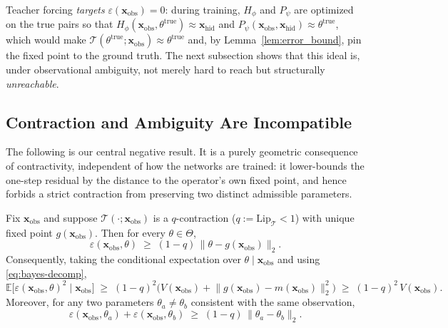 Teacher forcing \emph{targets} $\varepsilon(\mathbf{x}_\mathrm{obs})=0$: during training, $H_\phi$ and $P_\psi$ are optimized on the true pairs so that $H_\phi(\mathbf{x}_\mathrm{obs}, \theta^\mathrm{true})\approx \mathbf{x}_\mathrm{hid}$ and $P_\psi(\mathbf{x}_\mathrm{obs}, \mathbf{x}_\mathrm{hid})\approx \theta^\mathrm{true}$, which would make $\mathcal{T}(\theta^{\mathrm{true}}; \mathbf{x}_\mathrm{obs})\approx\theta^{\mathrm{true}}$ and, by Lemma~\ref{lem:error_bound}, pin the fixed point to the ground truth. The next subsection shows that this ideal is, under observational ambiguity, not merely hard to reach but structurally \emph{unreachable}.

\subsection{Contraction and Ambiguity Are Incompatible}
\label{subsec:incompat}

The following is our central negative result. It is a purely geometric consequence of contractivity, independent of how the networks are trained: it lower-bounds the one-step residual by the distance to the operator's own fixed point, and hence forbids a strict contraction from preserving two distinct admissible parameters.

\begin{theorem}
\label{thm:incompat}
Fix $\mathbf{x}_\mathrm{obs}$ and suppose $\mathcal{T}(\cdot;\mathbf{x}_\mathrm{obs})$ is a $q$-contraction ($q:=\mathrm{Lip}_\mathcal{T}<1$) with unique fixed point $g(\mathbf{x}_\mathrm{obs})$. Then for every $\theta\in\Theta$,
\begin{equation}
\label{eq:incompat-residual}
\varepsilon(\mathbf{x}_\mathrm{obs},\theta)\;\ge\;(1-q)\,\big\|\theta-g(\mathbf{x}_\mathrm{obs})\big\|_2 .
\end{equation}
Consequently, taking the conditional expectation over $\theta\mid\mathbf{x}_\mathrm{obs}$ and using \eqref{eq:bayes-decomp},
\begin{equation}
\label{eq:incompat-var}
\mathbb{E}\big[\varepsilon(\mathbf{x}_\mathrm{obs},\theta)^2 \mid \mathbf{x}_\mathrm{obs}\big]
\;\ge\;(1-q)^2\Big(V(\mathbf{x}_\mathrm{obs})+\big\|g(\mathbf{x}_\mathrm{obs})-m(\mathbf{x}_\mathrm{obs})\big\|_2^2\Big)
\;\ge\;(1-q)^2\,V(\mathbf{x}_\mathrm{obs}).
\end{equation}
Moreover, for any two parameters $\theta_a\neq\theta_b$ consistent with the same observation,
\begin{equation}
\label{eq:incompat-pair}
\varepsilon(\mathbf{x}_\mathrm{obs},\theta_a)+\varepsilon(\mathbf{x}_\mathrm{obs},\theta_b)\;\ge\;(1-q)\,\|\theta_a-\theta_b\|_2 .
\end{equation}
\end{theorem}


